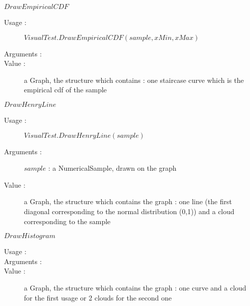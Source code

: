 \begin{description}
\begin{description}
  \item $DrawEmpiricalCDF$
    \begin{description}
    \item[Usage :] $VisualTest.DrawEmpiricalCDF(sample, xMin, xMax)$
    \item[Arguments :] \rule{0pt}{1em}
    \item[Value :]  a Graph, the structure which contains  : one staircase curve which is  the empirical cdf of the sample
    \end{description}
    \bigskip


  \item $DrawHenryLine$
    \begin{description}
    \item[Usage :] $VisualTest.DrawHenryLine(sample)$
    \item[Arguments :] $sample$ : a NumericalSample, drawn on the graph
    \item[Value :]  a Graph, the structure which contains the graph : one line (the first diagonal corresponding to the normal distribution (0,1)) and a cloud corresponding to the sample
    \end{description}
    \bigskip

  \item $DrawHistogram$
    \begin{description}
    \item[Usage :] \rule{0pt}{1em}
    \item[Arguments :] \rule{0pt}{1em}
    \item[Value :]  a Graph, the structure which contains the graph : one curve and a cloud for the first usage or 2 clouds for the second one
    \end{description}
    \bigskip


\end{description}
\end{description}
